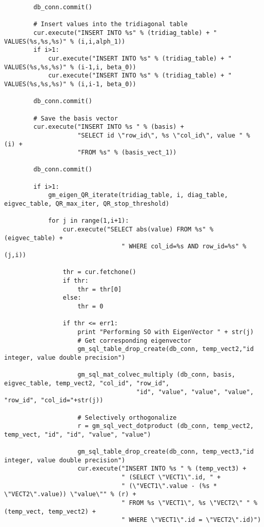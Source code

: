 \begin{lstlisting}
        db_conn.commit()

        # Insert values into the tridiagonal table
        cur.execute("INSERT INTO %s" % (tridiag_table) + " VALUES(%s,%s,%s)" % (i,i,alph_1))
        if i>1:
            cur.execute("INSERT INTO %s" % (tridiag_table) + " VALUES(%s,%s,%s)" % (i-1,i, beta_0))
            cur.execute("INSERT INTO %s" % (tridiag_table) + " VALUES(%s,%s,%s)" % (i,i-1, beta_0))

        db_conn.commit()

        # Save the basis vector
        cur.execute("INSERT INTO %s " % (basis) +
                    "SELECT id \"row_id\", %s \"col_id\", value " % (i) +
                    "FROM %s" % (basis_vect_1))

        db_conn.commit()

        if i>1:
            gm_eigen_QR_iterate(tridiag_table, i, diag_table, eigvec_table, QR_max_iter, QR_stop_threshold)

            for j in range(1,i+1):
                cur.execute("SELECT abs(value) FROM %s" % (eigvec_table) +
                                " WHERE col_id=%s AND row_id=%s" % (j,i))

                thr = cur.fetchone()
                if thr:
                    thr = thr[0]
                else:
                    thr = 0

                if thr <= err1:
                    print "Performing SO with EigenVector " + str(j)
                    # Get corresponding eigenvector
                    gm_sql_table_drop_create(db_conn, temp_vect2,"id integer, value double precision")

                    gm_sql_mat_colvec_multiply (db_conn, basis, eigvec_table, temp_vect2, "col_id", "row_id",
                                    "id", "value", "value", "value", "row_id", "col_id="+str(j))

                    # Selectively orthogonalize
                    r = gm_sql_vect_dotproduct (db_conn, temp_vect2, temp_vect, "id", "id", "value", "value")

                    gm_sql_table_drop_create(db_conn, temp_vect3,"id integer, value double precision")
                    cur.execute("INSERT INTO %s " % (temp_vect3) +
                                " (SELECT \"VECT1\".id, " +
                                " (\"VECT1\".value - (%s * \"VECT2\".value)) \"value\"" % (r) +
                                " FROM %s \"VECT1\", %s \"VECT2\" " % (temp_vect, temp_vect2) +
                                " WHERE \"VECT1\".id = \"VECT2\".id)")


\end{lstlisting}
